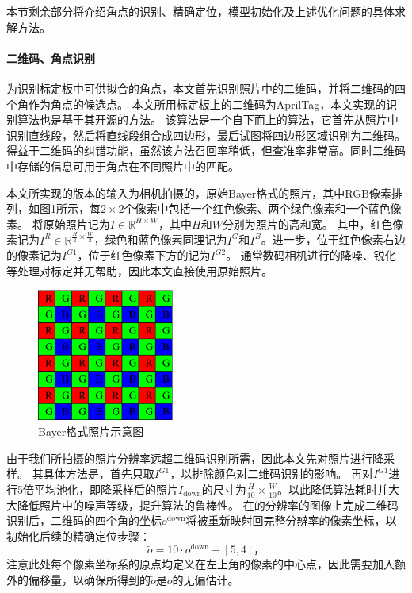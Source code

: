 本节剩余部分将介绍角点的识别、精确定位，模型初始化及上述优化问题的具体求解方法。

\paragraph{二维码、角点识别}为识别标定板中可供拟合的角点，本文首先识别照片中的二维码，并将二维码的四个角作为角点的候选点。
本文所用标定板上的二维码为AprilTag，本文实现的识别算法也是基于其开源的方法\cite{AprilTag}。
该算法是一个自下而上的算法，它首先从照片中识别直线段，然后将直线段组合成四边形，最后试图将四边形区域识别为二维码。得益于二维码的纠错功能，虽然该方法召回率稍低，但查准率非常高。同时二维码中存储的信息可用于角点在不同照片中的匹配。

本文所实现的版本的输入为相机拍摄的，原始Bayer格式的照片，其中RGB像素排列，如图\ref{fig:bayer}所示，每$2\times 2$个像素中包括一个红色像素、两个绿色像素和一个蓝色像素。
将原始照片记为$I\in \mathbb{R}^{H\times W}$，其中$H$和$W$分别为照片的高和宽。
其中，红色像素记为$I^R\in \mathbb{R}^{\frac{H}{2}\times \frac{W}{2}}$，绿色和蓝色像素同理记为$I^G$和$I^B$。进一步，位于红色像素右边的像素记为$I^{G1}$，位于红色像素下方的记为$I^{G2}$。
通常数码相机进行的降噪、锐化等处理对标定并无帮助，因此本文直接使用原始照片。

\begin{figure}
    \centering
    \includegraphics[width=0.4\textwidth]{figures/bayer}
    \caption{Bayer格式照片示意图}
    \label{fig:bayer}
\end{figure}

由于我们所拍摄的照片分辨率远超二维码识别所需，因此本文先对照片进行降采样。
其具体方法是，首先只取$I^{G1}$，以排除颜色对二维码识别的影响。
再对$I^{G1}$进行5倍平均池化，即降采样后的照片$I_{\text{down}}$的尺寸为$\frac{H}{10}\times \frac{W}{10}$。以此降低算法耗时并大大降低照片中的噪声等级，提升算法的鲁棒性。
在的分辨率的图像上完成二维码识别后，二维码的四个角的坐标$o^\mathrm{down}$将被重新映射回完整分辨率的像素坐标，以初始化后续的精确定位步骤：
\begin{equation}
    \tilde{o} = 10 \cdot o^\mathrm{down} + [5,4]
    \text{，}
\end{equation}
注意此处每个像素坐标系的原点均定义在左上角的像素的中心点，因此需要加入额外的偏移量，以确保所得到的$\tilde{o}$是$o$的无偏估计。

